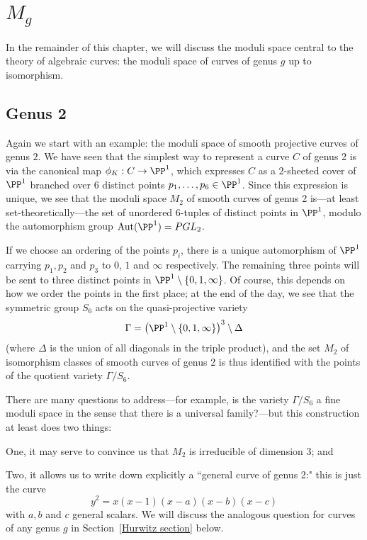 \section{$M_g$}


In the remainder of this chapter, we will discuss the moduli space central to the theory of algebraic curves: the moduli space of curves of genus $g$ up to isomorphism.

\subsection{Genus 2}                                                                                             

Again we start with an example: the moduli space of smooth projective curves of genus $2$. We have seen that the simplest way to represent a curve $C$ of genus 2 is via the canonical map $\phi_K : C \to \PP^1$, which expresses $C$ as a 2-sheeted cover of $\PP^1$ branched over 6 distinct points $p_1,\dots,p_6 \in \PP^1$. Since this expression is unique, we see that the moduli space $M_2$ of smooth curves of genus 2 is---at least set-theoretically---the set of unordered 6-tuples of distinct points in $\PP^1$, modulo the automorphism group ${\rm Aut}(\PP^1) = PGL_2$.

 If we choose an ordering of the points $p_i$, there is a unique automorphism of $\PP^1$ carrying $p_1, p_2$ and $p_3$ to $0$, $1$ and $\infty$ respectively.  The remaining three points will be sent to three distinct points in $\PP^1 \setminus \{0, 1, \infty \} $. Of course, this depends on how we order the points in the first place; at the end of the day, we see that the symmetric group $S_6$ acts on the quasi-projective variety
$$
\Gamma = \left( \PP^1 \setminus \{0, 1, \infty \} \right)^3 \setminus \Delta
$$
(where $\Delta$ is the union of all diagonals in the triple product), and the set $M_2$ of isomorphism classes of smooth curves of genus 2 is thus identified with the points of the quotient variety $\Gamma/S_6$.

There are many questions to address---for example, is the variety $\Gamma/S_6$ a fine moduli space in the sense that there is a universal family?---but this construction at least does two things:

One, it may serve to convince us that $M_2$ is irreducible of dimension 3; and

Two, it allows us to write down explicitly a ``general curve of genus 2:" this is just the curve
$$
y^2 = x(x-1)(x-a)(x-b)(x-c)
$$
with $a, b$ and $c$ general scalars. We will discuss the analogous question for curves of any genus $g$ in Section~\ref{Hurwitz section} below.

